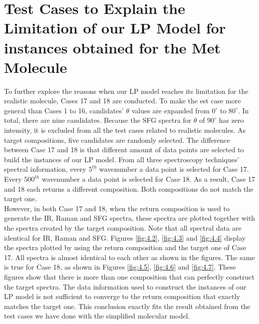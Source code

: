 \section{Test Cases to Explain the Limitation of our LP Model for instances obtained for the Met Molecule}

To further explore the reasons when our  LP model reaches its limitation for the realistic molecule, Cases 17 and 18 are conducted. To make the est case more general than Cases 1 to 16, candidates' $\theta$ values are expanded from $0^{\circ}$ to $80^{\circ}$. In total, there are nine candidates. Because the SFG spectra for $\theta$ of $90^{\circ}$ has zero intensity, it is excluded from all the test cases related to realistic molecules. As target compositions, five candidates are randomly selected. The difference between Case 17 and 18 is that different amount of data points are selected to build the instances of our LP model. From all three spectroscopy techniques' spectral information, every $5^{th}$ wavenumber a data point is selected for Case 17. Every $500^{th}$ wavenumber a data point is selected for Case 18. As a result, Case 17 and 18 each returns a different composition. Both compositions do not match the target one. \\

However, in both Case 17 and 18, when the return composition is used to generate the IR, Raman and SFG spectra, these spectra are plotted together with the spectra created by the target composition. Note that all spectral data are identical for IR, Raman and SFG. Figures \ref{fig:4.2}, \ref{fig:4.3} and \ref{fig:4.4} display the spectra plotted by using the return composition and the target one of Case 17. All spectra is almost identical to each other as shown in the figures. The same is true for Case 18, as shown in Figures \ref{fig:4.5}, \ref{fig:4.6} and \ref{fig:4.7}. These figures show that there is more than one composition that can perfectly construct the target spectra. The data information used to construct the instances of our LP model is not sufficient to converge to the return composition that exactly matches the target one. This conclusion exactly fits the result obtained from the test cases we have done with the simplified molecular model.\\

